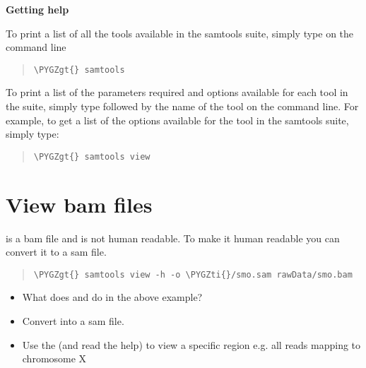 \documentclass[a4paper,11pt,english]{sphinxmanual}
\def\PYGZgt{\char`\>}
\def\PYGZti{\char`\~}
\begin{document}
\textbf{Getting help}

To print a list of all the tools available in the samtools suite, simply type  on the command line
\begin{quote}

\begin{Verbatim}[frame=single, rulecolor=\color{lightgray}, fontfamily=courier, commandchars=\\\{\}]
\PYGZgt{} samtools
\end{Verbatim}
\end{quote}

To print a list of the parameters required and options available for each tool in the suite, simply type  followed by the name of the tool on the command line. For example, to get a list of the options available for the  tool in the samtools suite, simply type:
\begin{quote}

\begin{Verbatim}[frame=single, rulecolor=\color{lightgray}, fontfamily=courier, commandchars=\\\{\}]
\PYGZgt{} samtools view
\end{Verbatim}
\end{quote}


\section{View bam files}
\label{exercises/STEP3_viewManipulateAlignmentData_samtools:view-bam-files}
 is a bam file and is not human readable. To make it human readable you can convert it to a sam file.
\begin{quote}

\begin{Verbatim}[frame=single, rulecolor=\color{lightgray}, fontfamily=courier, commandchars=\\\{\}]
\PYGZgt{} samtools view -h -o \PYGZti{}/smo.sam rawData/smo.bam
\end{Verbatim}
\end{quote}
\begin{itemize}
\item {} 
What does  and  do in the above example?

\item {} 
Convert  into a sam file.

\item {} 
Use the  (and read the help) to view a specific region e.g. all reads mapping to chromosome X

\end{itemize}
\end{document}
